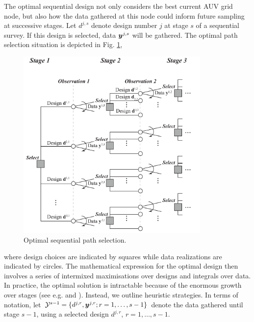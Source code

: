 \documentclass[aoas]{imsart}
\begin{document}
The optimal sequential design not only considers the best current AUV
grid node, but also how the data gathered at this node could inform
future sampling at successive stages. Let $d^{j,s}$ denote design
number $j$ at stage $s$ of a sequential survey. If this design is
selected, data ${\boldsymbol y}^{j,s}$ will be gathered. The optimal path
selection situation is depicted in Fig. \ref{fig:PathSelOpt},
\begin{figure}[b!]
\centering
\includegraphics[width=0.85\textwidth]{Figures/sequent_select.pdf}
\caption{Optimal sequential path selection.}\label{fig:PathSelOpt}
\end{figure}
where design choices are indicated by squares while data realizations are indicated by circles. 
The mathematical expression for the optimal design then involves a
series of intermixed maximisations over designs and integrals over
data. In practice, the optimal solution is intractable because of
the enormous growth over stages (see
e.g. \cite{sucar2015probabilistic} and \cite{powell2016perspectives}).
Instead, we outline heuristic strategies. In terms of notation, let
$\mathcal{Y}^{s-1} =\{d^{j,r}, {\boldsymbol y}^{j,r} ; r=1,\ldots,s-1 \}$ denote
the data gathered until stage $s-1$, using a selected design
$d^{j,r}$, $r=1,\ldots,s-1$.
\end{document}
